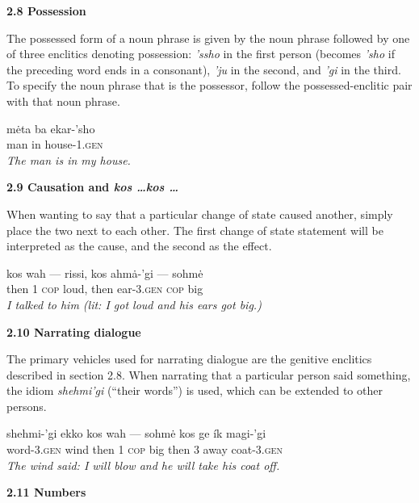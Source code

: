 \documentclass{article}[10pt]
\begin{document}
{\bf 2.8 Possession}

The possessed form of a noun phrase is given by the noun phrase followed by one of three enclitics denoting possession: \emph{'ssho} in the first person (becomes \emph{'sho} if the preceding word ends in a consonant), \emph{'ju} in the second, and \emph{'gi} in the third. To specify the noun phrase that is the possessor, follow the possessed-enclitic pair with that noun phrase.
\begin{exe}
\ex
\gll m\.{e}ta ba ekar-'sho\\
man in house-\textsc{1.gen}\\
\trans \emph{The man is in my house.}
\end{exe}

{\bf 2.9 Causation and \emph{kos \ldots kos \ldots}}

When wanting to say that a particular change of state caused another, simply place the two next to each other. The first change of state statement will be interpreted as the cause, and the second as the effect.
\begin{exe}
\ex
\gll kos wah --- rissi, kos ahm\.{a}-'gi --- sohm\.{e}\\
then 1 \textsc{cop} loud, then ear-\textsc{3.gen} \textsc{cop} big\\
\trans \emph{I talked to him (lit: I got loud and his ears got big.)}
\end{exe}

{\bf 2.10 Narrating dialogue}

The primary vehicles used for narrating dialogue are the genitive enclitics described in section 2.8. When narrating that a particular person said something, the idiom \emph{shehmi'gi} (``their words'') is used, which can be extended to other persons.
\begin{exe}
\ex
\gll shehmi-'gi ekko kos wah --- sohm\.{e} kos ge \'{i}k magi-'gi\\
word-\textsc{3.gen} wind then 1 \textsc{cop} big then 3 away coat-\textsc{3.gen}\\
\trans \emph{The wind said: I will blow and he will take his coat off.}
\end{exe}

{\bf 2.11 Numbers}
\end{document}
